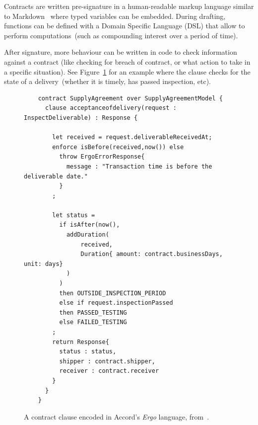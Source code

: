 Contracts are written pre-signature in a human-readable markup language similar to Markdown~\cite{markdownSpec}
where typed variables can be embedded.
During drafting, functions can be defined with a Domain Specific Language (DSL) that allow to perform
computations~(such as compounding interest over a period of time).

After signature, more behaviour can be written in code to check information against a contract (like checking for
breach of contract, or what action to take in a specific situation).
See Figure~\ref{fig:accord-post-signature-code} for an example where the clause checks for the state of a
delivery~(whether it is timely, has passed inspection, etc).

\begin{figure}[th]
    \centering
    \small
    \begin{verbatim}
    contract SupplyAgreement over SupplyAgreementModel {
      clause acceptanceofdelivery(request : InspectDeliverable) : Response {

        let received = request.deliverableReceivedAt;
        enforce isBefore(received,now()) else
          throw ErgoErrorResponse{
            message : "Transaction time is before the deliverable date."
          }
        ;

        let status =
          if isAfter(now(),
            addDuration(
                received,
                Duration{ amount: contract.businessDays, unit: days}
            )
          )
          then OUTSIDE_INSPECTION_PERIOD
          else if request.inspectionPassed
          then PASSED_TESTING
          else FAILED_TESTING
        ;
        return Response{
          status : status,
          shipper : contract.shipper,
          receiver : contract.receiver
        }
      }
    }
    \end{verbatim}
    \caption[Accord contract clause as code]{A contract clause encoded in Accord's \textit{Ergo} language,
        from~\cite{accordAfterSignatureCode}.}
    \label{fig:accord-post-signature-code}
\end{figure}

